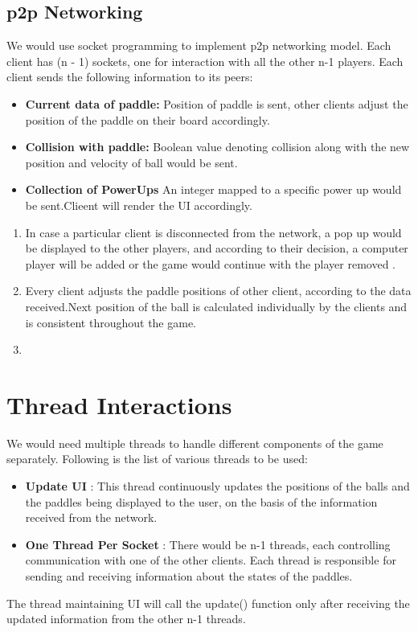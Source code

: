 \documentclass{article}
\begin{document}
			\subsection{p2p Networking}
			\par\noindent We would use socket programming to implement p2p networking model. Each client has (n - 1) sockets, one for interaction with all the other n-1 players. Each client sends the following information to its peers:
			\begin{itemize}
			\item \textbf{Current data of paddle:} Position of paddle is sent,  other clients adjust the position of the paddle on their board accordingly. 
			\item \textbf{Collision with paddle:} Boolean value denoting collision along with the new position and velocity of ball would be sent.
			\item \textbf{Collection of PowerUps} An integer mapped to a specific power up would be sent.Clieent will render the UI accordingly.
			\end{itemize}
				\begin{enumerate}
					\item In case a particular client is disconnected from the network, a pop up would be displayed to the other players, and according to their decision, a computer player will be added or the game would continue with the player removed .
					\item Every client adjusts the paddle positions of other client, according to the data received.Next position of the ball is calculated individually by the clients and is consistent throughout the game.
					\item  
				\end{enumerate}
			

	\section{Thread Interactions}
	\par\noindent We would need multiple threads to handle different components of the game separately. Following is the list of various threads to be used:
	\begin{itemize}
	\item \textbf{Update UI} : This thread continuously updates the positions of the balls and the paddles being displayed to the user, on the basis of the information received from the network.
	\item \textbf{One Thread Per Socket} : There would be n-1 threads, each controlling communication with one of the other clients. Each thread is responsible for sending and receiving information about the states of the paddles.
	\end{itemize}
	\par\noindent The thread maintaining UI will call the update() function only after receiving the updated information from the other n-1 threads.
\end{document}
